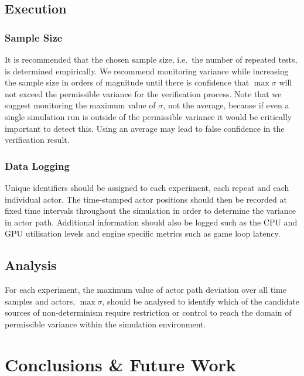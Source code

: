 \subsection{Execution}

\subsubsection{Sample Size}
It is recommended that the chosen sample size, i.e.\ the number of repeated tests, is determined empirically. We recommend monitoring variance while increasing the sample size in orders of magnitude until there is confidence that $\max\sigma$ will not exceed the permissible variance for the verification process. Note that we suggest monitoring the maximum value of $\sigma$, not the average, %
because if even a single simulation run is outside of the permissible variance it would be critically important to detect this. Using an average may lead to false confidence in the verification result.

\subsubsection{Data Logging}
Unique identifiers should be assigned to each experiment, each repeat and each individual actor. 
The time-stamped actor positions should then be recorded at fixed time intervals throughout the simulation in order to determine the variance in actor path. Additional information should also be logged such as the CPU and GPU utilisation levels and engine specific metrics such as game loop latency.

\subsection{Analysis}
For each experiment, the maximum value of actor path deviation over all time samples and actors, $\max\sigma$, should be analysed to identify which of the candidate sources of non-determinism require restriction or control to reach the domain of permissible variance within the simulation environment. 

\section{Conclusions \& Future Work}\label{s:conclusion}

